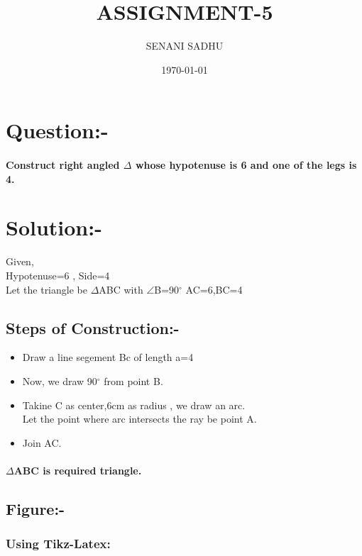 \documentclass[a4paper,12pt]{article}
\title{ASSIGNMENT-5}
\author{SENANI SADHU}
\date{\today}
\begin{document}
	\maketitle
	\section{Question:-}
	\paragraph{Construct right angled $\Delta$ whose hypotenuse is 6 and one of the legs is 4.}
	\section{Solution:-}
	Given,\\
	Hypotenuse=6 , Side=4\\
	Let the triangle be $\Delta$ABC with $\angle$B=90$^{\circ}$ AC=6,BC=4
	\subsection{Steps of Construction:-}
	\begin{itemize}
		\item Draw a line segement Bc of length a=4
		\item Now, we draw 90$^{\circ}$ from point B.
		\item Takine C as center,6cm as radius , we draw an arc.\\
		Let  the point  where arc intersects  the ray be point A.
		\item Join AC.
	\end{itemize}
\paragraph{$\Delta$ABC is required triangle.}
\subsection{Figure:-}
\subsubsection{Using Tikz-Latex:}
\begin{center}
\end{center}
\end{document}
